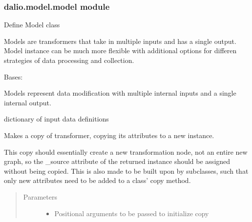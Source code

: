 \documentclass[letterpaper,10pt,english]{sphinxmanual}
\begin{document}
\subsubsection{dalio.model.model module}
\label{\detokenize{dalio.model:module-dalio.model.model}}\label{\detokenize{dalio.model:dalio-model-model-module}}
Define Model class

Models are transformers that take in multiple inputs and has a single output.
Model instance can be much more flexible with additional options for differen
strategies of data processing and collection.

\begin{fulllineitems}
\label{\detokenize{dalio.model:dalio.model.model.Model}}
Bases: 

Models represent data modification with multiple internal inputs and a
single internal output.

\begin{fulllineitems}
\label{\detokenize{dalio.model:dalio.model.model.Model._source}}
dictionary of input data definitions

\end{fulllineitems}


\begin{fulllineitems}
\label{\detokenize{dalio.model:dalio.model.model.Model.copy}}
Makes a copy of transformer, copying its attributes to a new
instance.

This copy should essentially create a new transformation node, not an
entire new graph, so the \_source attribute of the returned instance
should be assigned without being copied. This is also made to be built
upon by subclasses, such that only new attributes need to be added to
a class’ copy method.
\begin{quote}\begin{description}
\item[{Parameters}] \leavevmode\begin{itemize}
\item {} 
 \textendash{} Positional arguments to be passed to initialize copy


\end{itemize}
\end{description}
\end{quote}
\end{fulllineitems}
\end{fulllineitems}
\end{document}
